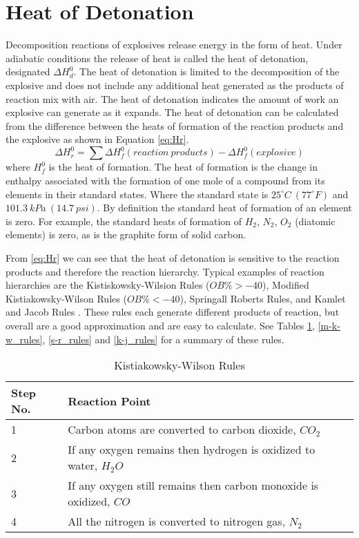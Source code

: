 \section{Heat of Detonation}

Decomposition reactions of explosives release energy in the form of heat.  Under adiabatic conditions the release of heat is called the heat of detonation, designated $\Delta H^0_d$.  The heat of detonation is limited to the decomposition of the explosive and does not include any additional heat generated as the products of reaction mix with air.  The heat of detonation indicates the amount of work an explosive can generate as it expands.
The heat of detonation can be calculated from the difference between the heats of formation of the reaction products and the explosive as shown in Equation \ref{eq:Hr}.
 \begin{equation}\label{eq:Hr}
\Delta H^0_r = \sum \Delta H^0_f(reaction\: products) - \Delta H^0_f(explosive)
\end{equation}
where $H^0_f$ is the heat of formation.  The heat of formation is the change in enthalpy associated with the formation of one mole of a compound from its elements in their standard states.  Where the standard state is $25^{\circ} C\:(77^{\circ} F)$ and $101.3\:kPa\:(14.7\:psi)$.  By definition the standard heat of formation of an element is zero. For example, the standard heats of formation of $H_2$, $N_2$, $O_2$ (diatomic elements) is zero, as is the graphite form of solid carbon.

 From \ref{eq:Hr} we can see that the heat of detonation is sensitive to the reaction products and therefore the reaction hierarchy.  Typical examples of reaction hierarchies are the Kistiskowsky-Wilsion Rules ($OB\%>-40$), Modified Kistiakowsky-Wilson Rules ($OB\%<-40$), Springall Roberts Rules, and Kamlet and Jacob Rules \cite{Akhavan:2004fk} \cite{Kamlet1968b}. These rules each generate different products of reaction, but overall are a good approximation and are easy to calculate.  See Tables \ref{k-w_rules}, \ref{m-k-w_rules}, \ref{s-r_rules} and \ref{k-j_rules} for a summary of these rules.
\begin{table}[!h]
\centering
\begin{tabular}{|l|p{12cm}|}
\hline
Step No.       & Reaction Point \\
\hline \hline
1 & Carbon atoms are converted to carbon dioxide, $CO_2$         \\
\hline
2 & If any oxygen remains then hydrogen is oxidized to water, $H_2O$          \\
\hline
3 & If any oxygen still remains then carbon monoxide is oxidized, $CO$         \\
\hline
4 & All the nitrogen is converted to nitrogen gas, $N_2$          \\
\hline
\end{tabular}
\caption{Kistiakowsky-Wilson Rules}
\label{k-w_rules}
\end{table}

